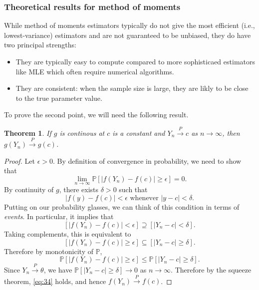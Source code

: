 \documentclass[10pt]{article}
\newtheorem{theorem}{Theorem}
\theoremstyle{definition}
\newcommand{\1}[1]{\textbf{1}_{\left[#1\right]}} %
\def\P{\mathbb{P}} %
\begin{document}
\subsubsection{Theoretical results for method of moments}
While method of moments estimators typically do not give the most efficient
(i.e., lowest-variance) estimators and are not guaranteed to be unbiased, they
do have two principal strengths:
\begin{itemize}
  \item They are typically easy to compute compared to more sophisticaed
  estimators like MLE which often require numerical algorithms.
  \item They are consistent: when the sample size is large, they are likly to
  be close to the true parameter value.
\end{itemize}
To prove the second point, we will need the following result.
\begin{theorem}
  \label{thm:convergence-in-probability-to-c-preserved-by-continuity}
  If $g$ is continous at $c$ is a constant and $Y_{n}\overset{P}{\to} c$ as $n\to \infty$,
  then $g(Y_{n})\overset{P}{\to} g(c)$.
\end{theorem}
\begin{proof}
  Let $\epsilon>0$. By definition of convergence in probability, we need to
  show that
  \begin{equation}\label{eq:34}
    \lim_{n\to\infty} \P\left[ |f(Y_{n})-f(c)| \geq \epsilon \right]=0.
  \end{equation}
  By continuity of $g$, there exists $\delta>0$ such that
  \begin{equation*}
    |f(y) - f(c)| <\epsilon \text{ whenever }|y-c|<\delta.
  \end{equation*}
  Putting on our probability glasses, we can think of this condition in terms
  of \textit{events}. In particular, it implies that
  \begin{equation*}
    \left[ |f(Y_{n})-f(c)|<\epsilon \right] \supseteq \left[ |Y_{n}-c|<\delta \right].
  \end{equation*}
  Taking complements, this is equivalent to
  \begin{equation*}
    \left[ |f(Y_{n})-f(c)| \geq \epsilon \right] \subseteq \left[ |Y_{n}-c| \geq \delta \right].
  \end{equation*}
  Therefore by monotonicity of $\P$,
  \begin{equation*}
    \P\left[ |f(Y_{n})-f(c)| \geq \epsilon \right] \leq \P\left[ |Y_{n}-c| \geq \delta \right].
  \end{equation*}
  Since $Y_{n}\overset{P}{\to} \theta$, we have
  $\P\left[ |Y_{n}-c| \geq \delta \right]\to 0$ as $n\to \infty$. Therefore by
  the squeeze theorem, \cref{eq:34} holds, and hence
  $f(Y_{n})\overset{P}{\to} f(c)$.
\end{proof}
\end{document}
